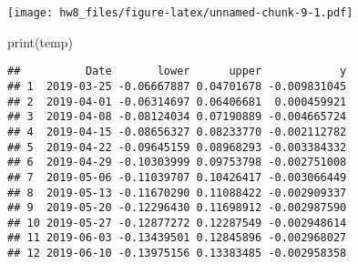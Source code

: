 \documentclass[
]{article}
\newenvironment{Shaded}{\begin{snugshade}}{\end{snugshade}}
\newcommand{\FunctionTok}[1]{\textcolor[rgb]{0.00,0.00,0.00}{#1}}
\newcommand{\NormalTok}[1]{#1}
\begin{document}
\texttt{[image: hw8\_files/figure-latex/unnamed-chunk-9-1.pdf]}

\begin{Shaded}
\begin{Highlighting}[]
\FunctionTok{print}\NormalTok{(temp)}
\end{Highlighting}
\end{Shaded}

\begin{verbatim}
##          Date       lower      upper            y
## 1  2019-03-25 -0.06667887 0.04701678 -0.009831045
## 2  2019-04-01 -0.06314697 0.06406681  0.000459921
## 3  2019-04-08 -0.08124034 0.07190889 -0.004665724
## 4  2019-04-15 -0.08656327 0.08233770 -0.002112782
## 5  2019-04-22 -0.09645159 0.08968293 -0.003384332
## 6  2019-04-29 -0.10303999 0.09753798 -0.002751008
## 7  2019-05-06 -0.11039707 0.10426417 -0.003066449
## 8  2019-05-13 -0.11670290 0.11088422 -0.002909337
## 9  2019-05-20 -0.12296430 0.11698912 -0.002987590
## 10 2019-05-27 -0.12877272 0.12287549 -0.002948614
## 11 2019-06-03 -0.13439501 0.12845896 -0.002968027
## 12 2019-06-10 -0.13975156 0.13383485 -0.002958358
\end{verbatim}
\end{document}
